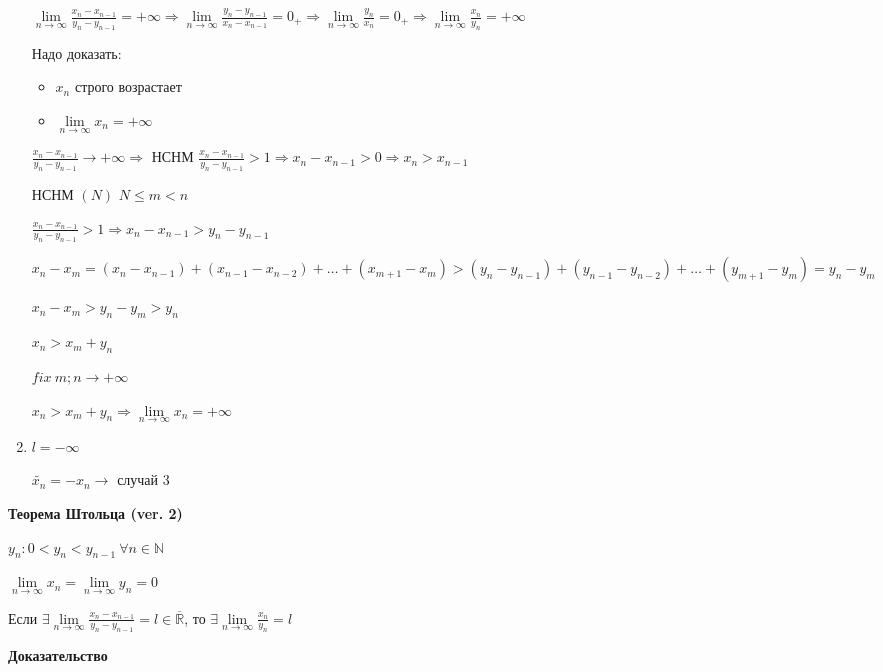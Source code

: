 \documentclass[14pt, letter paper]{article}
\begin{document}
\begin{enumerate}
    $\lim\limits_{n \rightarrow \infty}{\frac{x_n - x_{n-1}}{y_n - y_{n-1}}} = + \infty \Rightarrow \lim\limits_{n \rightarrow \infty}{\frac{y_n - y_{n-1}}{x_n - x_{n-1}}} = 0_+ \Rightarrow \lim\limits_{n \rightarrow \infty}{\frac{y_n}{x_n}} = 0_+ \Rightarrow \lim\limits_{n \rightarrow \infty}{\frac{x_n}{y_n}} = + \infty$

    Надо доказать:

    \begin{itemize}
        \item $x_n$ строго возрастает
        \item $\lim\limits_{n \rightarrow \infty}{x_n} = + \infty$
    \end{itemize}

    $\frac{x_n - x_{n-1}}{y_n - y_{n-1}} \rightarrow + \infty \Rightarrow$ НСНМ $\frac{x_n - x_{n-1}}{y_n-y_{n-1}} > 1 \Rightarrow x_n - x_{n-1} > 0 \Rightarrow x_n > x_{n-1}$

    НСНМ $(N)$ $N \leq m < n$

    $\frac{x_n - x_{n-1}}{y_n - y_{n-1}} > 1 \Rightarrow x_n - x_{n-1} > y_n - y_{n-1}$

    $x_n - x_m = (x_n - x_{n-1}) + (x_{n-1} - x_{n-2}) + \ldots + (x_{m+1} - x_m) > (y_n - y_{n-1}) + (y_{n-1} - y_{n-2}) + \ldots + (y_{m+1} - y_m) = y_n - y_m$

    $x_n - x_m > y_n - y_m > y_n$

    $x_n > x_m + y_n$

    $fix\ m; n \rightarrow + \infty$

    $x_n > x_m + y_n \Rightarrow \lim\limits_{n \rightarrow \infty}{x_n} = + \infty$

    \item $l = - \infty$

    $\tilde{x_n} = -x_n \rightarrow$ случай 3
\end{enumerate}

\textbf{Теорема Штольца (ver. 2)}

$y_n : 0 < y_n < y_{n-1}\ \forall n \in \mathds{N}$

$\lim\limits_{n \rightarrow \infty}{x_n} = \lim\limits_{n \rightarrow \infty}{y_n} = 0$

Если $\exists \lim\limits_{n \rightarrow \infty}{\frac{x_n-x_{n-1}}{y_n - y_{n-1}}} = l \in \overline{\mathds{R}}$, то $\exists \lim\limits_{n \rightarrow \infty}{\frac{x_n}{y_n}} = l$

\begin{center}
    \textbf{Доказательство}
\end{center}
\end{document}
